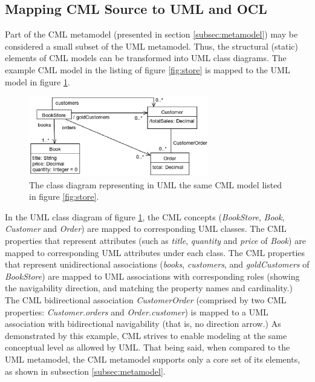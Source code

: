 \subsection{Mapping CML Source to UML and OCL}\label{subsec:mapping}

Part of the CML metamodel (presented in section \ref{subsec:metamodel}) may be considered a small subset of the UML  \cite{uml} metamodel.
Thus, the structural (static) elements of CML models can be transformed into UML class diagrams. The example CML model in the listing of figure \ref{fig:store} is mapped to the UML model in figure \ref{fig:uml}.

\begin{figure}
\centering
\includegraphics[width=0.7\textwidth]{language/diagram-uml}
\caption{The class diagram representing in UML  \cite{uml} the same CML model listed in figure \ref{fig:store}.}
\label{fig:uml}
\end{figure}

In the UML class diagram of figure \ref{fig:uml},
the CML concepts (\emph{BookStore}, \emph{Book}, \emph{Customer} and \emph{Order})
are mapped to corresponding UML classes.
The CML properties that represent attributes
(such as \emph{title}, \emph{quantity} and \emph{price} of \emph{Book})
are mapped to corresponding UML attributes under each class.
The CML properties that represent unidirectional associations
(\emph{books}, \emph{customers}, and \emph{goldCustomers} of \emph{BookStore})
are mapped to UML associations with corresponding roles
(showing the navigability direction, and matching the property names and cardinality.)
The CML bidirectional association \emph{CustomerOrder}
(comprised by two CML properties: \emph{Customer.orders} and \emph{Order.customer})
is mapped to a UML association with bidirectional navigability (that is, no direction arrow.)
As demonstrated by this example,
CML strives to enable modeling at the same conceptual level as allowed by UML.
That being said,
when compared to the UML metamodel,
the CML metamodel supports only a core set of its elements, as shown in subsection \ref{subsec:metamodel}.

